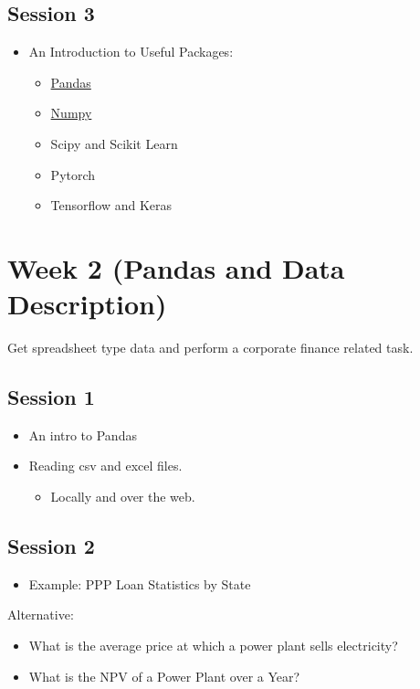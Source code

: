 \documentclass[11pt]{article}
\begin{document}
\subsection{Session 3}
\label{sec:orgf00e66d}

\begin{itemize}
\item An Introduction to Useful Packages:
\begin{itemize}
\item \href{https://pandas.pydata.org/}{Pandas}
\item \href{https://numpy.org/}{Numpy}
\item Scipy and Scikit Learn
\item Pytorch
\item Tensorflow and Keras
\end{itemize}
\end{itemize}

\section{Week 2 (Pandas and Data Description)}
\label{sec:org3b0425f}
Get spreadsheet type data and perform a corporate finance related task.
\subsection{Session 1}
\label{sec:org0b74b21}
\begin{itemize}
\item An intro to Pandas
\item Reading csv and excel files.
\begin{itemize}
\item Locally and over the web.
\end{itemize}
\end{itemize}

\subsection{Session 2}
\label{sec:orgdd30512}

\begin{itemize}
\item Example: PPP Loan Statistics by State
\end{itemize}

Alternative:
\begin{itemize}
\item What is the average price at which a power plant sells electricity?
\item What is the NPV of a Power Plant over a Year?
\end{itemize}
\end{document}
